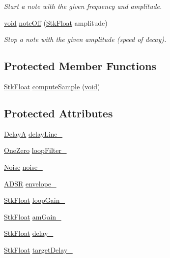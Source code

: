 \begin{DoxyCompactItemize}
\begin{DoxyCompactList}\small\item\em Start a note with the given frequency and amplitude. \end{DoxyCompactList}\item 
\hyperlink{sound_8c_ae35f5844602719cf66324f4de2a658b3}{void} \hyperlink{class_nyq_1_1_sitar_adb1495b1b68780cc1c039a9aa8bf023c}{note\+Off} (\hyperlink{namespace_nyq_a044fa20a706520a617bbbf458a7db7e4}{Stk\+Float} amplitude)
\begin{DoxyCompactList}\small\item\em Stop a note with the given amplitude (speed of decay). \end{DoxyCompactList}\end{DoxyCompactItemize}
\subsection*{Protected Member Functions}
\begin{DoxyCompactItemize}
\item 
\hyperlink{namespace_nyq_a044fa20a706520a617bbbf458a7db7e4}{Stk\+Float} \hyperlink{class_nyq_1_1_sitar_ab2d2e8830ce30571dd789dee7a7ccb18}{compute\+Sample} (\hyperlink{sound_8c_ae35f5844602719cf66324f4de2a658b3}{void})
\end{DoxyCompactItemize}
\subsection*{Protected Attributes}
\begin{DoxyCompactItemize}
\item 
\hyperlink{class_nyq_1_1_delay_a}{DelayA} \hyperlink{class_nyq_1_1_sitar_a32f19e1e08eee588ba905d80f51d3fbb}{delay\+Line\+\_\+}
\item 
\hyperlink{class_nyq_1_1_one_zero}{One\+Zero} \hyperlink{class_nyq_1_1_sitar_a80fc83b557930d1d96fc0f286bb6d7c3}{loop\+Filter\+\_\+}
\item 
\hyperlink{class_nyq_1_1_noise}{Noise} \hyperlink{class_nyq_1_1_sitar_ae2f9f4955a6facfce935efc75128f599}{noise\+\_\+}
\item 
\hyperlink{class_nyq_1_1_a_d_s_r}{A\+D\+SR} \hyperlink{class_nyq_1_1_sitar_a0016f0999222bf430b84aa386d95c11d}{envelope\+\_\+}
\item 
\hyperlink{namespace_nyq_a044fa20a706520a617bbbf458a7db7e4}{Stk\+Float} \hyperlink{class_nyq_1_1_sitar_a966ff4d5349640aff398fa5af4635811}{loop\+Gain\+\_\+}
\item 
\hyperlink{namespace_nyq_a044fa20a706520a617bbbf458a7db7e4}{Stk\+Float} \hyperlink{class_nyq_1_1_sitar_aef5c3572a0588d617e8c68659d272b4e}{am\+Gain\+\_\+}
\item 
\hyperlink{namespace_nyq_a044fa20a706520a617bbbf458a7db7e4}{Stk\+Float} \hyperlink{class_nyq_1_1_sitar_a0eb324a14bdd7f544a273e5984197d6d}{delay\+\_\+}
\item 
\hyperlink{namespace_nyq_a044fa20a706520a617bbbf458a7db7e4}{Stk\+Float} \hyperlink{class_nyq_1_1_sitar_ac60d88700b8e542affd3b9a106d2ce5a}{target\+Delay\+\_\+}
\end{DoxyCompactItemize}
